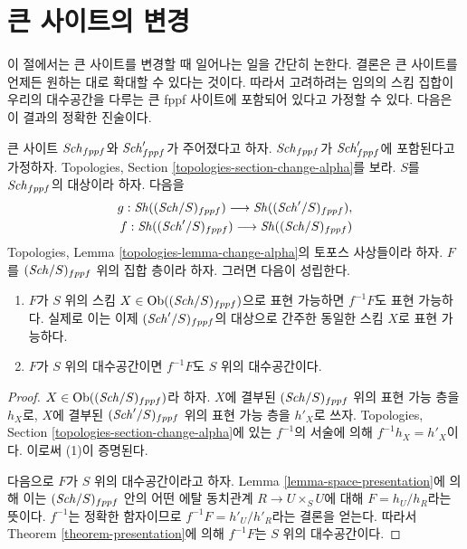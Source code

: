 \section{큰 사이트의 변경}
\label{section-change-big-site}

\noindent
이 절에서는 큰 사이트를 변경할 때 일어나는 일을 간단히 논한다.
결론은 큰 사이트를 언제든 원하는 대로 확대할 수 있다는 것이다.
따라서 고려하려는 임의의 스킴 집합이 우리의 대수공간을 다루는
큰 fppf 사이트에 포함되어 있다고 가정할 수 있다. 다음은 이 결과의
정확한 진술이다.

\begin{lemma}
\label{lemma-change-big-site}
큰 사이트 $\mathit{Sch}_{fppf}$와 $\mathit{Sch}'_{fppf}$가 주어졌다고 하자.
$\mathit{Sch}_{fppf}$가 $\mathit{Sch}'_{fppf}$에 포함된다고 가정하자.
Topologies, Section \ref{topologies-section-change-alpha}를 보라.
$S$를 $\mathit{Sch}_{fppf}$의 대상이라 하자. 다음을
\begin{align*}
g : \mathop{\mathit{Sh}}\nolimits((\mathit{Sch}/S)_{fppf})
\longrightarrow
\mathop{\mathit{Sh}}\nolimits((\mathit{Sch}'/S)_{fppf}), \\
f : \mathop{\mathit{Sh}}\nolimits((\mathit{Sch}'/S)_{fppf})
\longrightarrow
\mathop{\mathit{Sh}}\nolimits((\mathit{Sch}/S)_{fppf})
\end{align*}
Topologies, Lemma \ref{topologies-lemma-change-alpha}의 토포스 사상들이라
하자. $F$를 $(\mathit{Sch}/S)_{fppf}$ 위의 집합 층이라 하자. 그러면 다음이
성립한다.
\begin{enumerate}
\item $F$가 $S$ 위의 스킴
$X \in \mathop{\mathrm{Ob}}\nolimits((\mathit{Sch}/S)_{fppf})$으로 표현 가능하면 $f^{-1}F$도 표현
가능하다. 실제로 이는 이제 $(\mathit{Sch}'/S)_{fppf}$의 대상으로 간주한
동일한 스킴 $X$로 표현 가능하다.
\item $F$가 $S$ 위의 대수공간이면 $f^{-1}F$도 $S$ 위의
대수공간이다.
\end{enumerate}
\end{lemma}

\begin{proof}
$X \in \mathop{\mathrm{Ob}}\nolimits((\mathit{Sch}/S)_{fppf})$라 하자. $X$에 결부된
$(\mathit{Sch}/S)_{fppf}$ 위의 표현 가능 층을 $h_X$로, $X$에 결부된
$(\mathit{Sch}'/S)_{fppf}$ 위의 표현 가능 층을 $h'_X$로 쓰자.
Topologies, Section \ref{topologies-section-change-alpha}에 있는
$f^{-1}$의 서술에 의해 $f^{-1}h_X = h'_X$이다. 이로써 (1)이
증명된다.

\medskip\noindent
다음으로 $F$가 $S$ 위의 대수공간이라고 하자. Lemma
\ref{lemma-space-presentation}에 의해 이는 $(\mathit{Sch}/S)_{fppf}$ 안의
어떤 에탈 동치관계 $R \to U \times_S U$에 대해
$F = h_U/h_R$라는 뜻이다. $f^{-1}$는 정확한 함자이므로
$f^{-1}F = h'_U/h'_R$라는 결론을 얻는다. 따라서 Theorem
\ref{theorem-presentation}에 의해 $f^{-1}F$는 $S$ 위의
대수공간이다.
\end{proof}

